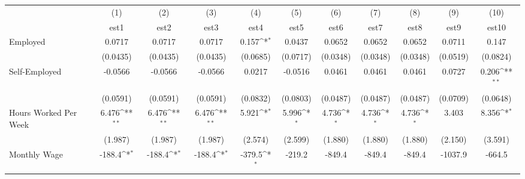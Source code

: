 {
\def\sym#1{\ifmmode^{#1}\else\(^{#1}\)\fi}
\begin{tabular}{l*{10}{c}}
\toprule
            &\multicolumn{1}{c}{(1)}&\multicolumn{1}{c}{(2)}&\multicolumn{1}{c}{(3)}&\multicolumn{1}{c}{(4)}&\multicolumn{1}{c}{(5)}&\multicolumn{1}{c}{(6)}&\multicolumn{1}{c}{(7)}&\multicolumn{1}{c}{(8)}&\multicolumn{1}{c}{(9)}&\multicolumn{1}{c}{(10)}\\
            &\multicolumn{1}{c}{est1}&\multicolumn{1}{c}{est2}&\multicolumn{1}{c}{est3}&\multicolumn{1}{c}{est4}&\multicolumn{1}{c}{est5}&\multicolumn{1}{c}{est6}&\multicolumn{1}{c}{est7}&\multicolumn{1}{c}{est8}&\multicolumn{1}{c}{est9}&\multicolumn{1}{c}{est10}\\
\midrule
Employed    &      0.0717         &      0.0717         &      0.0717         &       0.157\sym{*}  &      0.0437         &      0.0652         &      0.0652         &      0.0652         &      0.0711         &       0.147         \\
            &    (0.0435)         &    (0.0435)         &    (0.0435)         &    (0.0685)         &    (0.0717)         &    (0.0348)         &    (0.0348)         &    (0.0348)         &    (0.0519)         &    (0.0824)         \\
\addlinespace
Self-Employed&     -0.0566         &     -0.0566         &     -0.0566         &      0.0217         &     -0.0516         &      0.0461         &      0.0461         &      0.0461         &      0.0727         &       0.206\sym{**} \\
            &    (0.0591)         &    (0.0591)         &    (0.0591)         &    (0.0832)         &    (0.0803)         &    (0.0487)         &    (0.0487)         &    (0.0487)         &    (0.0709)         &    (0.0648)         \\
\addlinespace
Hours Worked Per Week&       6.476\sym{**} &       6.476\sym{**} &       6.476\sym{**} &       5.921\sym{*}  &       5.996\sym{*}  &       4.736\sym{*}  &       4.736\sym{*}  &       4.736\sym{*}  &       3.403         &       8.356\sym{*}  \\
            &     (1.987)         &     (1.987)         &     (1.987)         &     (2.574)         &     (2.599)         &     (1.880)         &     (1.880)         &     (1.880)         &     (2.150)         &     (3.591)         \\
\addlinespace
Monthly Wage&      -188.4\sym{*}  &      -188.4\sym{*}  &      -188.4\sym{*}  &      -379.5\sym{*}  &      -219.2         &      -849.4         &      -849.4         &      -849.4         &     -1037.9         &      -664.5         \\

\end{tabular}}
